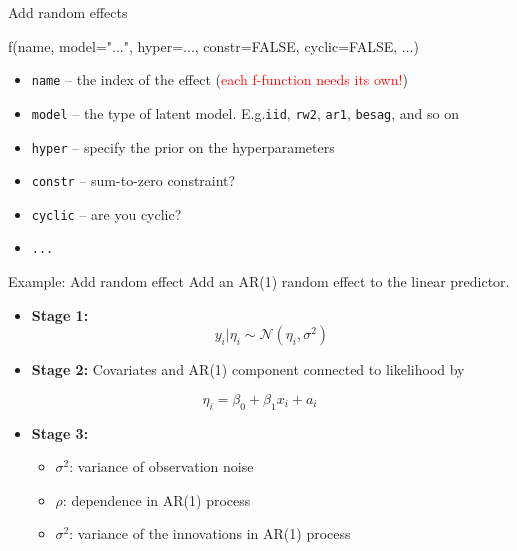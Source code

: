 \documentclass[
  ignorenonframetext,
]{beamer}
\newenvironment{Shaded}{\begin{snugshade}}{\end{snugshade}}
\newcommand{\AttributeTok}[1]{\textcolor[rgb]{0.77,0.63,0.00}{#1}}
\newcommand{\ConstantTok}[1]{\textcolor[rgb]{0.00,0.00,0.00}{#1}}
\newcommand{\FunctionTok}[1]{\textcolor[rgb]{0.00,0.00,0.00}{#1}}
\newcommand{\NormalTok}[1]{#1}
\newcommand{\StringTok}[1]{\textcolor[rgb]{0.31,0.60,0.02}{#1}}
\providecommand{\tightlist}{%
  \setlength{\itemsep}{0pt}\setlength{\parskip}{0pt}}
\begin{document}
\begin{frame}[fragile]{Add random effects}
\protect\hypertarget{add-random-effects-1}{}
\begin{Shaded}
\begin{Highlighting}[]
\FunctionTok{f}\NormalTok{(name, }\AttributeTok{model=}\StringTok{"..."}\NormalTok{, }\AttributeTok{hyper=}\NormalTok{...,}
                 \AttributeTok{constr=}\ConstantTok{FALSE}\NormalTok{, }\AttributeTok{cyclic=}\ConstantTok{FALSE}\NormalTok{, ...)}
\end{Highlighting}
\end{Shaded}

\begin{itemize}
\tightlist
\item
  \texttt{name} -- the index of the effect
  (\textcolor{red}{each f-function needs its own!})
\item
  \texttt{model} -- the type of latent model. E.g.\texttt{iid},
  \texttt{rw2}, \texttt{ar1}, \texttt{besag}, and so on
\item
  \texttt{hyper} -- specify the prior on the hyperparameters
\item
  \texttt{constr} -- sum-to-zero constraint?
\item
  \texttt{cyclic} -- are you cyclic?
\item
  \texttt{...}
\end{itemize}
\end{frame}

\begin{frame}{Example: Add random effect}
\protect\hypertarget{example-add-random-effect}{}
Add an AR(1) random effect to the linear predictor.

\begin{itemize}
\item
  \textbf{Stage 1:} \[
    y_i|\eta_i \sim \mathcal{N}(\eta_i, \sigma^2)
  \]
\item
  \textbf{Stage 2:} Covariates and AR(1) component connected to
  likelihood by
\end{itemize}

\[
    \eta_i = \beta_0 + \beta_1 x_i + a_i
\]

\begin{itemize}
\item
  \textbf{Stage 3:}

  \begin{itemize}
  \item
    \(\sigma^2\): variance of observation noise
  \item
    \(\rho\): dependence in AR(1) process
  \item
    \(\sigma^2\): variance of the innovations in AR(1) process
  \end{itemize}
\end{itemize}
\end{frame}
\end{document}
